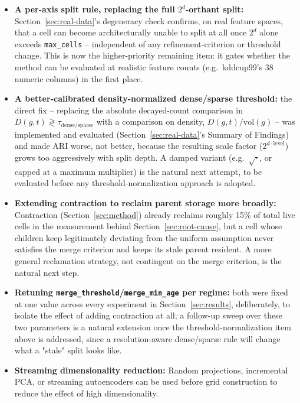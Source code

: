 \documentclass[11pt]{article}
\begin{document}
\begin{itemize}
    \item \textbf{A per-axis split rule, replacing the full \(2^d\)-orthant split:} Section~\ref{sec:real-data}'s degeneracy check confirms, on real feature spaces, that a cell can become architecturally unable to split at all once \(2^d\) alone exceeds \texttt{max\_cells} -- independent of any refinement-criterion or threshold change. This is now the higher-priority remaining item: it gates whether the method can be evaluated at realistic feature counts (e.g.\ kddcup99's 38 numeric columns) in the first place.
    \item \textbf{A better-calibrated density-normalized dense/sparse threshold:} the direct fix -- replacing the absolute decayed-count comparison in \(D(g,t) \gtrless \tau_{\text{dense/sparse}}\) with a comparison on density, \(D(g,t) / \text{vol}(g)\) -- was implemented and evaluated (Section~\ref{sec:real-data}'s Summary of Findings) and made ARI worse, not better, because the resulting scale factor (\(2^{d\cdot\text{level}}\)) grows too aggressively with split depth. A damped variant (e.g.\ \(\sqrt{\cdot}\), or capped at a maximum multiplier) is the natural next attempt, to be evaluated before any threshold-normalization approach is adopted.
    \item \textbf{Extending contraction to reclaim parent storage more broadly:} Contraction (Section~\ref{sec:method}) already reclaims roughly 15\% of total live cells in the measurement behind Section~\ref{sec:root-cause}, but a cell whose children keep legitimately deviating from the uniform assumption never satisfies the merge criterion and keeps its stale parent resident. A more general reclamation strategy, not contingent on the merge criterion, is the natural next step.
    \item \textbf{Retuning \texttt{merge\_threshold}/\texttt{merge\_min\_age} per regime:} both were fixed at one value across every experiment in Section~\ref{sec:results}, deliberately, to isolate the effect of adding contraction at all; a follow-up sweep over these two parameters is a natural extension once the threshold-normalization item above is addressed, since a resolution-aware dense/sparse rule will change what a "stale" split looks like.
    \item \textbf{Streaming dimensionality reduction:} Random projections, incremental PCA, or streaming autoencoders can be used before grid construction to reduce the effect of high dimensionality.
    

\end{itemize}
\end{document}
